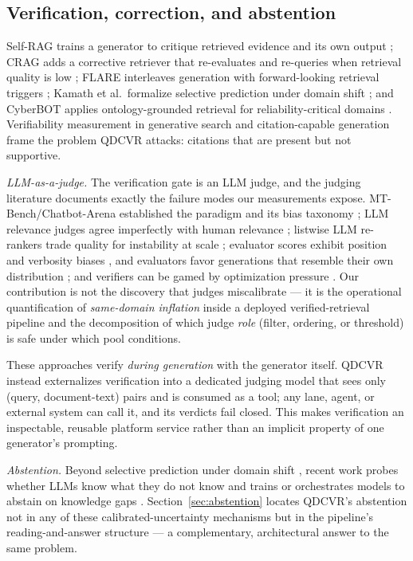 \documentclass[preprint,12pt]{elsarticle}
\begin{document}
\subsection{Verification, correction, and abstention}
Self-RAG trains a generator to critique retrieved evidence and its own output
\cite{selfrag}; CRAG adds a corrective retriever that re-evaluates and
re-queries when retrieval quality is low \cite{crag}; FLARE interleaves
generation with forward-looking retrieval triggers \cite{flare}; Kamath et
al.\ formalize selective prediction under domain shift \cite{kamath}; and
CyberBOT applies ontology-grounded retrieval for reliability-critical
domains \cite{cyberbot}. Verifiability measurement in generative search
\cite{liu-verifiability} and citation-capable generation \cite{gao-citations}
frame the problem QDCVR attacks: citations that are present but not
supportive.

\emph{LLM-as-a-judge.} The verification gate is an LLM judge, and the
judging literature documents exactly the failure modes our measurements
expose. MT-Bench/Chatbot-Arena established the paradigm and its bias
taxonomy \cite{zheng-llmjudge}; LLM relevance judges agree imperfectly with
human relevance \cite{sun-urara}; listwise LLM re-rankers trade quality for
instability at scale \cite{rankgpt}; evaluator scores exhibit position and
verbosity biases \cite{zheng-llmjudge}, and evaluators favor generations
that resemble their own distribution \cite{panickssery-selfpref};
and verifiers can be gamed by optimization pressure \cite{lightman-verify}.
Our contribution is not the discovery that judges miscalibrate --- it is the
operational quantification of \emph{same-domain inflation} inside a deployed
verified-retrieval pipeline and the decomposition of which judge \emph{role}
(filter, ordering, or threshold) is safe under which pool conditions.

These approaches verify \emph{during generation} with the generator itself.
QDCVR instead externalizes verification into a dedicated judging model that
sees only (query, document-text) pairs and is consumed as a tool; any lane,
agent, or external system can call it, and its verdicts fail closed. This
makes verification an inspectable, reusable platform service rather than an
implicit property of one generator's prompting.

\emph{Abstention.} Beyond selective prediction under domain shift
\cite{kamath}, recent work probes whether LLMs know what they do not know
\cite{yin-knowwhat} and trains or orchestrates models to abstain on
knowledge gaps \cite{feng-abstain}. Section~\ref{sec:abstention} locates
QDCVR's abstention not in any of these calibrated-uncertainty mechanisms
but in the pipeline's reading-and-answer structure --- a complementary,
architectural answer to the same problem.
\end{document}
